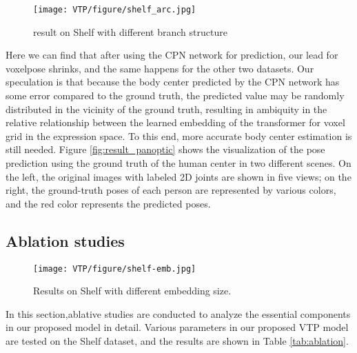 \documentclass[lettersize,journal]{IEEEtran}
\begin{document}
\begin{figure*}[!htp]
  \texttt{[image: VTP/figure/shelf\_arc.jpg]}
  \caption{result on Shelf with different branch structure}
  \label{two branch}
\end{figure*}

\par Here we can find that after using the CPN network for prediction, our lead for voxelpose shrinks, and the same happens for the other two datasets. Our speculation is that because the body center predicted by the CPN network has some error compared to the ground truth, the predicted value may be randomly distributed in the vicinity of the ground truth, resulting in ambiquity in the relative relationship between the learned embedding of the transformer for voxel grid in the expression space. To this end, more accurate body center estimation is still needed.
Figure \ref{fig:result_panoptic} shows the visualization of the pose prediction using the ground truth of the human center in two different scenes. On the left, the original images with labeled 2D joints are shown in five views; on the right, the ground-truth poses of each person are represented by various colors, and the red color represents the predicted poses.




\subsection{Ablation studies}

\begin{figure*}[!htp]
  \texttt{[image: VTP/figure/shelf-emb.jpg]}
  \caption{Results on Shelf with different embedding size.}
  \label{embedding result}
\end{figure*}


\par In this section,ablative studies are conducted to analyze the essential components in our proposed model in detail. Various parameters in our proposed VTP model are tested on the Shelf dataset, and the results are shown in Table \ref{tab:ablation}.
\end{document}
